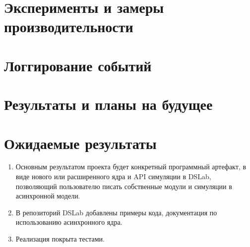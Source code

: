 \section{Эксперименты и замеры производительности}

\section{Логгирование событий}

\section{Результаты и планы на будущее}

\newpage 
\section{Ожидаемые результаты}

\begin{enumerate}
    \item 
    Основным результатом проекта будет конкретный программный артефакт, в виде нового или расширенного ядра и API симуляции в DSLab, позволяющий пользователю писать собственные модули и симуляции в асинхронной модели. 
    \item В репозиторий DSLab \cite{dslab-repo} добавлены примеры кода, документация по использованию асинхронного ядра.
    \item Реализация покрыта тестами.
\end{enumerate}


